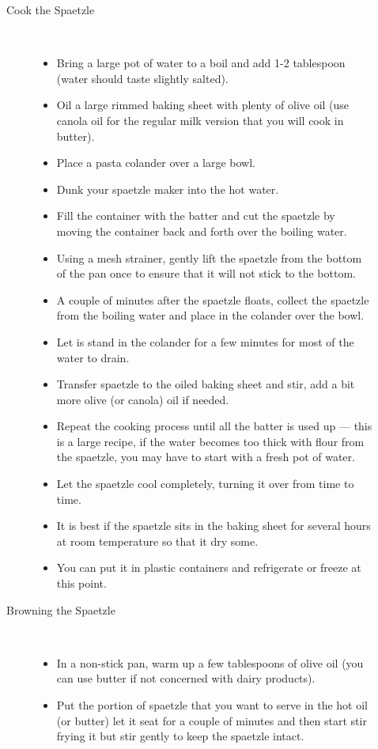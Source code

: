 \documentclass [11pt, letterpaper] {article}
\begin{document}
\begin{description}
\begin{description}
\begin{itemize}
		\end{itemize}
	\item[Cook the Spaetzle]\ \\
		\begin{itemize}
			\item Bring a large pot of water to a boil and add 1-2 tablespoon (water should taste slightly salted). 
			\item Oil a large rimmed baking sheet with plenty of olive oil (use canola oil for the regular milk version that you will cook in butter).
			\item Place a pasta colander over a large bowl.
			\item Dunk your spaetzle maker into the hot water. 
			\item Fill the container with the batter and cut the spaetzle by moving the container back and forth over the boiling water.
			\item Using a mesh strainer, gently lift the spaetzle from the bottom of the pan once to ensure that it will not stick to the bottom.
			\item A couple of minutes after the spaetzle floats, collect the spaetzle from the boiling water and place in the colander over the bowl.
			\item Let is stand in the colander for a few minutes for most of the water to drain.
			\item Transfer spaetzle to the oiled baking sheet and stir, add a bit more olive (or canola) oil if needed.
			\item Repeat the cooking process until all the batter is used up --- this is a large recipe, if the water becomes too thick with flour from the spaetzle, you may have to start with a fresh pot of water.
			\item Let the spaetzle cool completely, turning it over from time to time.
			\item It is best if the spaetzle sits in the baking sheet for several hours at room temperature so that it dry some.
			\item You can put it in plastic containers and refrigerate or freeze at this point.
		\end{itemize}
	\item[Browning the Spaetzle]\ \\
		\begin{itemize}
			\item In a non-stick pan, warm up a few tablespoons of olive oil (you can use butter if not concerned with dairy products). 
			\item Put the portion of spaetzle that you want to serve in the hot oil (or butter) let it seat for a couple of minutes and then start stir frying it but stir gently to keep the spaetzle intact.

\end{itemize}
\end{description}
\end{description}
\end{document}
